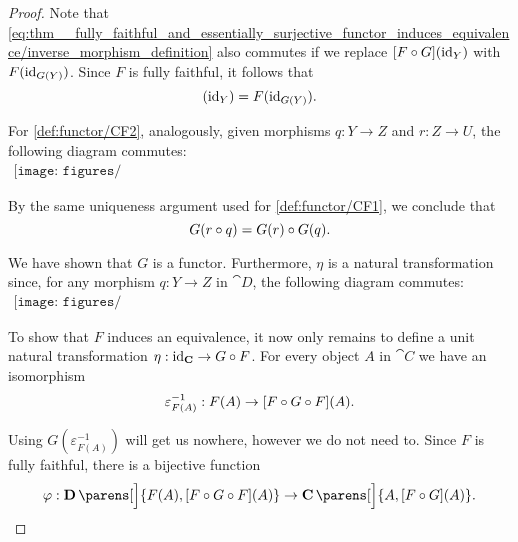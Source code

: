 \begin{proof}
  Note that \eqref{eq:thm__fully_faithful_and_essentially_surjective_functor_induces_equivalence/inverse_morphism_definition} also commutes if we replace \( [F \bincirc G](\id_Y) \) with \( F(\operatorname{id}_{G(Y)}) \). Since \( F \) is fully faithful, it follows that
  \begin{equation*}
    [F \bincirc G](\id_Y) = F(\id_{G(Y)}).
  \end{equation*}

  For \ref{def:functor/CF2}, analogously, given morphisms \( q: Y \to Z \) and \( r: Z \to U \), the following diagram commutes:
  \begin{equation}\label{eq:thm__fully_faithful_and_essentially_surjective_functor_induces_equivalence/composition}
    \begin{aligned}
      \texttt{[image: figures/thm\_\_fully\_faithful\_and\_essentially\_surjective\_functor\_induces\_equivalence.pdf]}
    \end{aligned}
  \end{equation}

  By the same uniqueness argument used for \ref{def:functor/CF1}, we conclude that
  \begin{equation*}
    G(r \bincirc q) = G(r) \bincirc G(q).
  \end{equation*}

  We have shown that \( G \) is a functor. Furthermore, \( \eta \) is a natural transformation since, for any morphism \( q: Y \to Z \) in \( \cat{D} \), the following diagram commutes:
  \begin{equation}\label{eq:thm__fully_faithful_and_essentially_surjective_functor_induces_equivalence/varepsilon}
    \begin{aligned}
      \texttt{[image: figures/thm\_\_fully\_faithful\_and\_essentially\_surjective\_functor\_induces\_equivalence.pdf]}
    \end{aligned}
  \end{equation}

  To show that \( F \) induces an equivalence, it now only remains to define a unit natural transformation \( \eta: \id_{\cat{C}} \to G \bincirc F \). For every object \( A \) in \( \cat{C} \) we have an isomorphism
  \begin{equation*}
    \varepsilon_{F(A)}^{-1}: F(A) \to [F \bincirc G \bincirc F](A).
  \end{equation*}

  Using \( G(\varepsilon_{F(A)}^{-1}) \) will get us nowhere, however we do not need to. Since \( F \) is fully faithful, there is a bijective function
  \begin{equation*}
    \varphi: \cat{D}\parens[\Big]{ F(A), [F \bincirc G \bincirc F](A) } \to \cat{C}\parens[\Big]{ A, [F \bincirc G](A) }.
  \end{equation*}


\end{proof}
